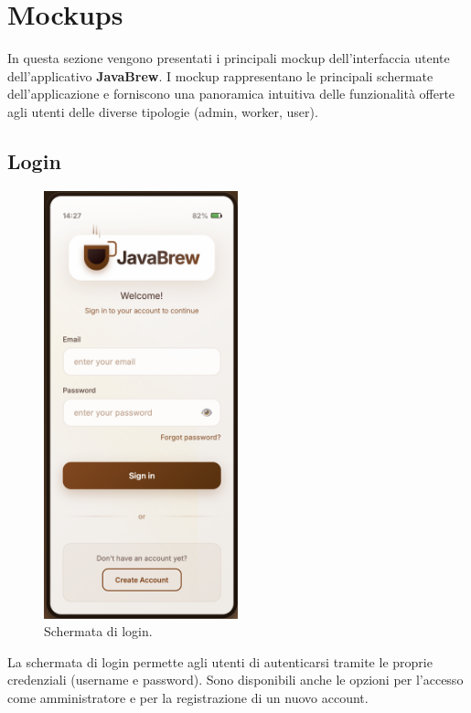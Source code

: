 \section{Mockups}
In questa sezione vengono presentati i principali mockup dell'interfaccia utente dell'applicativo \textbf{JavaBrew}. I mockup rappresentano le principali schermate dell'applicazione e forniscono una panoramica intuitiva delle funzionalità offerte agli utenti delle diverse tipologie (admin, worker, user).

\subsection{Login}
\begin{figure}[H]
    \centering
    \includegraphics[width=0.5\textwidth]{./assets/login.png}
    \caption{Schermata di login.}
\end{figure}
La schermata di login permette agli utenti di autenticarsi tramite le proprie credenziali (username e password). Sono disponibili anche le opzioni per l’accesso come amministratore e per la registrazione di un nuovo account.

